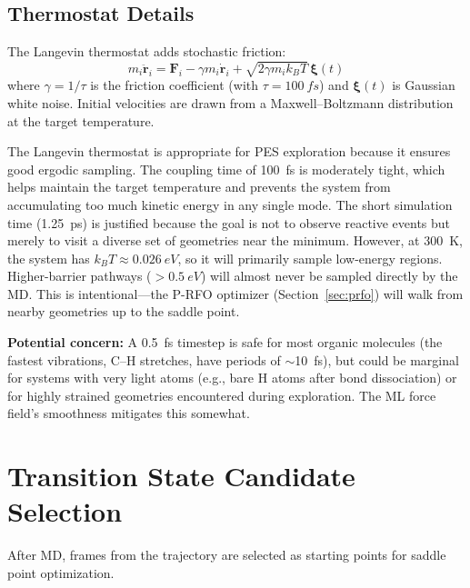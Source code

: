 \documentclass[11pt,a4paper]{article}
\begin{document}
\subsection{Thermostat Details}

The Langevin thermostat adds stochastic friction:
\begin{equation}
    m_i \ddot{\mathbf{r}}_i = \mathbf{F}_i - \gamma m_i \dot{\mathbf{r}}_i + \sqrt{2 \gamma m_i k_B T}\, \boldsymbol{\xi}(t)
\end{equation}
where $\gamma = 1/\tau$ is the friction coefficient (with $\tau = \SI{100}{fs}$) and $\boldsymbol{\xi}(t)$ is Gaussian white noise. Initial velocities are drawn from a Maxwell--Boltzmann distribution at the target temperature.

\begin{evaluation}
The Langevin thermostat is appropriate for PES exploration because it ensures good ergodic sampling. The coupling time of \SI{100}{fs} is moderately tight, which helps maintain the target temperature and prevents the system from accumulating too much kinetic energy in any single mode. The short simulation time (\SI{1.25}{ps}) is justified because the goal is not to observe reactive events but merely to visit a diverse set of geometries near the minimum. However, at \SI{300}{K}, the system has $k_BT \approx \SI{0.026}{eV}$, so it will primarily sample low-energy regions. Higher-barrier pathways ($> \SI{0.5}{eV}$) will almost never be sampled directly by the MD. This is intentional---the P-RFO optimizer (Section~\ref{sec:prfo}) will walk from nearby geometries up to the saddle point.

\textbf{Potential concern:} A \SI{0.5}{fs} timestep is safe for most organic molecules (the fastest vibrations, C--H stretches, have periods of $\sim$\SI{10}{fs}), but could be marginal for systems with very light atoms (e.g., bare H atoms after bond dissociation) or for highly strained geometries encountered during exploration. The ML force field's smoothness mitigates this somewhat.
\end{evaluation}


\section{Transition State Candidate Selection}
\label{sec:ts-sampling}

After MD, frames from the trajectory are selected as starting points for saddle point optimization.
\end{document}
